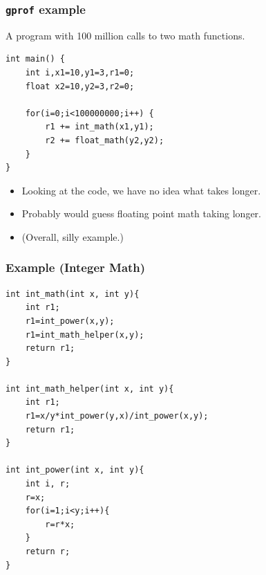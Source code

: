 \begin{frame}[fragile]
  \frametitle{{\tt gprof} example}

  

\begin{changemargin}{1.5cm}
    A program with 100 million calls to two math functions.

  \begin{lstlisting}
int main() {
    int i,x1=10,y1=3,r1=0;
    float x2=10,y2=3,r2=0;

    for(i=0;i<100000000;i++) {
        r1 += int_math(x1,y1);
        r2 += float_math(y2,y2);
    }
}
  \end{lstlisting}

  \begin{itemize}
    \item Looking at the code, we have no idea what takes longer.
    \item Probably would guess floating point math taking longer.
    \item (Overall, silly example.)
  \end{itemize}
  \end{changemargin}
\end{frame}

\begin{frame}[fragile]
  \frametitle{Example (Integer Math)}

  

\begin{changemargin}{1.5cm}
  \begin{lstlisting}
int int_math(int x, int y){
    int r1;
    r1=int_power(x,y);
    r1=int_math_helper(x,y);
    return r1;
}

int int_math_helper(int x, int y){
    int r1;
    r1=x/y*int_power(y,x)/int_power(x,y);
    return r1;
}

int int_power(int x, int y){
    int i, r;
    r=x;
    for(i=1;i<y;i++){
        r=r*x;
    }
    return r;
}
  \end{lstlisting}
  \end{changemargin}
\end{frame}


